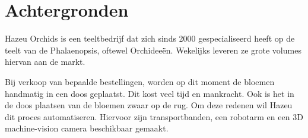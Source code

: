 \section{Achtergronden}

Hazeu Orchids is een teeltbedrijf dat zich sinds 2000 gespecialiseerd heeft op de teelt van de Phalaenopsis, oftewel Orchideeën.
Wekelijks leveren ze grote volumes hiervan aan de markt.

\bigskip

Bij verkoop van bepaalde bestellingen, worden op dit moment de bloemen handmatig in een doos geplaatst.
Dit kost veel tijd en mankracht.
Ook is het in de doos plaatsen van de bloemen zwaar op de rug.
Om deze redenen wil Hazeu dit proces automatiseren.
Hiervoor zijn transportbanden, een robotarm en een 3D machine-vision camera beschikbaar gemaakt.

\newpage